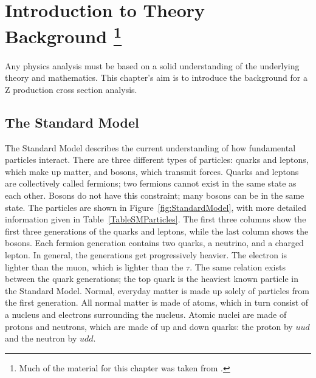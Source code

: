 \chapter[Introduction to Theory Background]{Introduction to Theory Background \protect\footnote{Much of the material for this chapter was taken from \cite{HM}.}}
\label{theory}

Any physics analysis must be based on a 
solid understanding of the 
underlying theory and mathematics.  
This chapter's aim is to introduce 
the background for a Z production 
cross section analysis.  


\section{The Standard Model}
\label{theory:SM}




The Standard Model describes the current understanding 
of how fundamental particles interact.  
There are three different types of particles: 
quarks and leptons, 
which make up matter, 
and bosons, which transmit forces.  
Quarks and leptons are collectively called fermions; 
two fermions cannot exist in the same state as each other.  
Bosons do not have this constraint; 
many bosons can be in the same state.  
The particles are shown in Figure~\ref{fig:StandardModel}, 
with more detailed information given in 
Table~\ref{TableSMParticles}. 
The first three columns show the first three generations 
of the quarks and leptons, 
while the last column shows the bosons.  
Each fermion generation contains two quarks, 
a neutrino, and a charged lepton.  
In general, the generations get progressively heavier.  
The electron is lighter than the muon, 
which is lighter than the $\tau$.   
The same relation exists between the quark generations; 
the top quark is the heaviest known particle in the Standard Model.  %
Normal, everyday matter is made up solely of particles 
from the first generation.  
All normal matter is made of atoms, 
which in turn consist of a nucleus and 
electrons surrounding the nucleus.  
Atomic nuclei are made of protons and neutrons, 
which are made of up and down quarks: 
the proton by $uud$ and the neutron by $udd$.  

